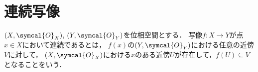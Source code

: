 \documentclass[../main.tex]{subfiles}
\begin{document}
\section{連続写像}
\begin{thmbox}
\begin{definition}
\((X, \symcal{O}_{X})\), \((Y, \symcal{O}_{Y})\)を位相空間とする．
写像\(f\colon X \to Y\)が点\(x \in X\)において連続であるとは，
\(f(x)\)の\((Y, \symcal{O}_{Y})\)における任意の近傍\(V\)に対して，
\((X, \symcal{O}_{X})\)における\(x\)のある近傍\(U\)が存在して，\(f(U) \subseteq V\)となることをいう．
\end{definition}
\end{thmbox}
\end{document}
